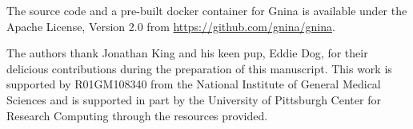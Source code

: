 \documentclass[journal=jcisd8,manuscript=article]{achemso}
\begin{document}
The source code and a pre-built docker container for Gnina is available under the Apache License, Version 2.0 from \url{https://github.com/gnina/gnina}.


\begin{acknowledgement}
The authors thank Jonathan King and his keen pup, Eddie Dog, for their delicious contributions during the preparation of this manuscript.
This work is supported by R01GM108340 from the National Institute of General Medical Sciences and is supported in part by the University of Pittsburgh Center for Research Computing through the resources provided.



\end{acknowledgement}

\begin{suppinfo}
  


\end{suppinfo}


\end{document}
